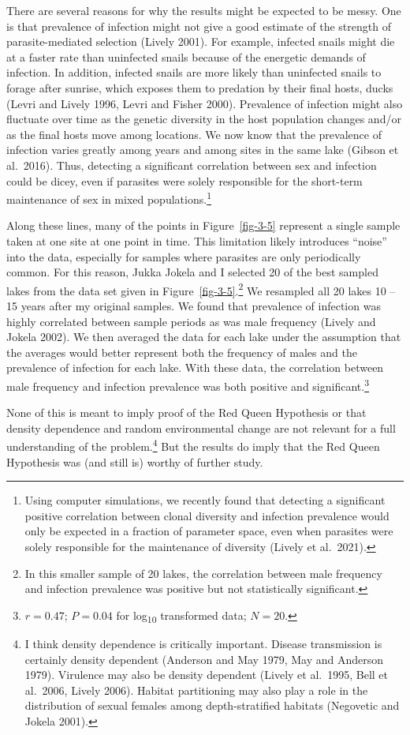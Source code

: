 \documentclass[
  letterpaper,
]{book}
\begin{document}
There are several reasons for why the results might be expected to be
messy. One is that prevalence of infection might not give a good
estimate of the strength of parasite-mediated selection (Lively 2001).
For example, infected snails might die at a faster rate than uninfected
snails because of the energetic demands of infection. In addition,
infected snails are more likely than uninfected snails to forage after
sunrise, which exposes them to predation by their final hosts, ducks
(Levri and Lively 1996, Levri and Fisher 2000). Prevalence of infection
might also fluctuate over time as the genetic diversity in the host
population changes and/or as the final hosts move among locations. We
now know that the prevalence of infection varies greatly among years and
among sites in the same lake (Gibson et al.~2016). Thus, detecting a
significant correlation between sex and infection could be dicey, even
if parasites were solely responsible for the short-term maintenance of
sex in mixed populations.\footnote{Using computer simulations, we
  recently found that detecting a significant positive correlation
  between clonal diversity and infection prevalence would only be
  expected in a fraction of parameter space, even when parasites were
  solely responsible for the maintenance of diversity (Lively et
  al.~2021).}

Along these lines, many of the points in Figure~\ref{fig-3-5} represent
a single sample taken at one site at one point in time. This limitation
likely introduces ``noise'' into the data, especially for samples where
parasites are only periodically common. For this reason, Jukka Jokela
and I selected 20 of the best sampled lakes from the data set given in
Figure~\ref{fig-3-5}.\footnote{In this smaller sample of 20 lakes, the
  correlation between male frequency and infection prevalence was
  positive but not statistically significant.} We resampled all 20 lakes
10 -- 15 years after my original samples. We found that prevalence of
infection was highly correlated between sample periods as was male
frequency (Lively and Jokela 2002). We then averaged the data for each
lake under the assumption that the averages would better represent both
the frequency of males and the prevalence of infection for each lake.
With these data, the correlation between male frequency and infection
prevalence was both positive and significant.\footnote{\(r = 0.47\);
  \(P = 0.04\) for log\textsubscript{10} transformed data; \(N = 20\).}

None of this is meant to imply proof of the Red Queen Hypothesis or that
density dependence and random environmental change are not relevant for
a full understanding of the problem.\footnote{I think density dependence
  is critically important. Disease transmission is certainly density
  dependent (Anderson and May 1979, May and Anderson 1979). Virulence
  may also be density dependent (Lively et al.~1995, Bell et al.~2006,
  Lively 2006). Habitat partitioning may also play a role in the
  distribution of sexual females among depth-stratified habitats
  (Negovetic and Jokela 2001).} But the results do imply that the Red
Queen Hypothesis was (and still is) worthy of further study.
\end{document}
